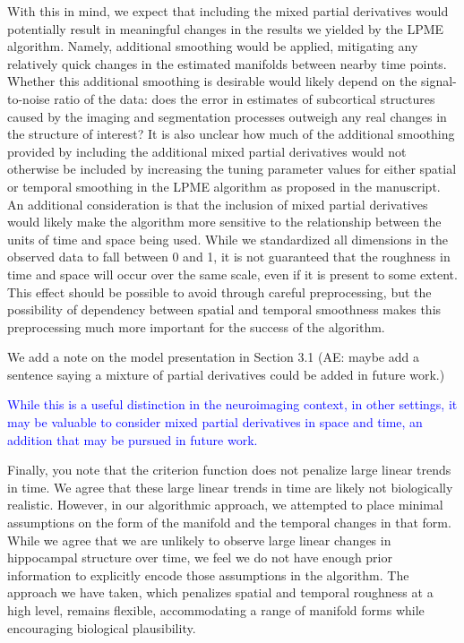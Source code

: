 \documentclass[12pt]{article}
\theoremstyle{definition}
\newcommand{\revision}[1]{\textcolor{blue}{#1}}
\begin{document}
\begin{enumerate}
With this in mind, we expect that including the mixed partial derivatives would potentially result in meaningful changes in the results we yielded by the LPME algorithm. Namely, additional smoothing would be applied, mitigating any relatively quick changes in the estimated manifolds between nearby time points. Whether this additional smoothing is desirable would likely depend on the signal-to-noise ratio of the data: does the error in estimates of subcortical structures caused by the imaging and segmentation processes outweigh any real changes in the structure of interest? It is also unclear how much of the additional smoothing provided by including the additional mixed partial derivatives would not otherwise be included by increasing the tuning parameter values for either spatial or temporal smoothing in the LPME algorithm as proposed in the manuscript. An additional consideration is that the inclusion of mixed partial derivatives would likely make the algorithm more sensitive to the relationship between the units of time and space being used. While we standardized all dimensions in the observed data to fall between 0 and 1, it is not guaranteed that the roughness in time and space will occur over the same scale, even if it is present to some extent. This effect should be possible to avoid through careful preprocessing, but the possibility of dependency between spatial and temporal smoothness makes this preprocessing much more important for the success of the algorithm.

We add a note on the model presentation in Section 3.1 (AE: maybe add a sentence saying a mixture of partial derivatives could be added in future work.)

\revision{While this is a useful distinction in the neuroimaging context, in other settings, it may be valuable to consider mixed partial derivatives in space and time, an addition that may be pursued in future work.}

Finally, you note that the criterion function does not penalize large linear trends in time. We agree that these large linear trends in time are likely not biologically realistic. However, in our algorithmic approach, we attempted to place minimal assumptions on the form of the manifold and the temporal changes in that form. While we agree that we are unlikely to observe large linear changes in hippocampal structure over time, we feel we do not have enough prior information to explicitly encode those assumptions in the algorithm. The approach we have taken, which penalizes spatial and temporal roughness at a high level, remains flexible, accommodating a range of manifold forms while encouraging biological plausibility. 


\end{enumerate}
\end{document}
